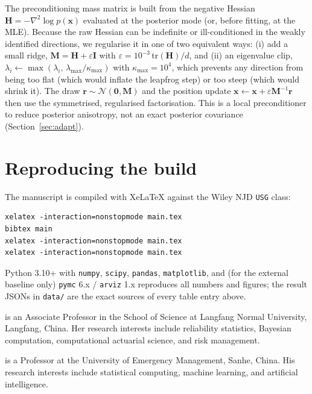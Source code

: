 \documentclass[ASNA,twocolumn]{USG}
\begin{document}
The preconditioning mass matrix is built from the negative Hessian
$\bm H=-\nabla^{2}\log p(\bm x)$ evaluated at the posterior mode (or,
before fitting, at the MLE). Because the raw Hessian can be indefinite or
ill-conditioned in the weakly identified directions, we regularise it in
one of two equivalent ways: (i) add a small ridge, $\bm M=\bm H+\varepsilon
\bm I$ with $\varepsilon=10^{-3}\,\mathrm{tr}(\bm H)/d$, and (ii) an
eigenvalue clip, $\lambda_i\leftarrow\max(\lambda_i,\,\lambda_{\max}/\kappa_{\max})$
with $\kappa_{\max}=10^{4}$, which prevents any direction from being too
flat (which would inflate the leapfrog step) or too steep (which would
shrink it). The draw $\bm r\sim\mathcal N(\bm0,\bm M)$ and the position
update $\bm x\leftarrow\bm x+\varepsilon\bm M^{-1}\bm r$ then use the
symmetrised, regularised factorisation. This is a local preconditioner to
reduce posterior anisotropy, not an exact posterior covariance
(Section~\ref{sec:adapt}).

\section{Reproducing the build}\label{app:build}
The manuscript is compiled with XeLaTeX against the Wiley NJD
\texttt{USG} class:
\begin{verbatim}
xelatex -interaction=nonstopmode main.tex
bibtex main
xelatex -interaction=nonstopmode main.tex
xelatex -interaction=nonstopmode main.tex
\end{verbatim}
Python 3.10+ with \texttt{numpy}, \texttt{scipy}, \texttt{pandas},
\texttt{matplotlib}, and (for the external baseline only) \texttt{pymc}
6.x / \texttt{arviz} 1.x reproduces all numbers and figures; the result
JSONs in \texttt{data/} are the exact sources of every table entry above.



\begin{biography}{}{%
\author{Huirong Cao} is an Associate Professor in the School of Science at
Langfang Normal University, Langfang, China. Her research interests include
reliability statistics, Bayesian computation, computational actuarial
science, and risk management.}
\end{biography}

\begin{biography}{}{%
\author{Fuchang Wang} is a Professor at the University of Emergency
Management, Sanhe, China. His research interests include statistical
computing, machine learning, and artificial intelligence.}
\end{biography}
\end{document}

